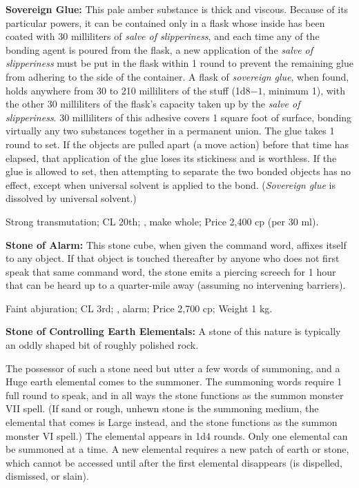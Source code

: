 \textbf{Sovereign Glue:} This pale amber substance is thick and viscous. Because of its particular powers, it can be contained only in a flask whose inside has been coated with 30 milliliters of \emph{salve of slipperiness}, and each time any of the bonding agent is poured from the flask, a new application of the \emph{salve of slipperiness} must be put in the flask within 1 round to prevent the remaining glue from adhering to the side of the container. A flask of \emph{sovereign glue}, when found, holds anywhere from 30 to 210 milliliters of the stuff (1d8$-1$, minimum 1), with the other 30 milliliters of the flask's capacity taken up by the \emph{salve of slipperiness}. 30 milliliters of this adhesive covers 1 square foot of surface, bonding virtually any two substances together in a permanent union. The glue takes 1 round to set. If the objects are pulled apart (a move action) before that time has elapsed, that application of the glue loses its stickiness and is worthless. If the glue is allowed to set, then attempting to separate the two bonded objects has no effect, except when universal solvent is applied to the bond. (\emph{Sovereign glue} is dissolved by universal solvent.)

Strong transmutation; CL 20th; , make whole; Price 2,400 cp (per 30 ml).



\textbf{Stone of Alarm:} This stone cube, when given the command word, affixes itself to any object. If that object is touched thereafter by anyone who does not first speak that same command word, the stone emits a piercing screech for 1 hour that can be heard up to a quarter-mile away (assuming no intervening barriers).

Faint abjuration; CL 3rd; , alarm; Price 2,700 cp; Weight 1 kg.



\textbf{Stone of Controlling Earth Elementals:} A stone of this nature is typically an oddly shaped bit of roughly polished rock.

The possessor of such a stone need but utter a few words of summoning, and a Huge earth elemental comes to the summoner. The summoning words require 1 full round to speak, and in all ways the stone functions as the summon monster VII spell. (If sand or rough, unhewn stone is the summoning medium, the elemental that comes is Large instead, and the stone functions as the summon monster VI spell.) The elemental appears in 1d4 rounds. Only one elemental can be summoned at a time. A new elemental requires a new patch of earth or stone, which cannot be accessed until after the first elemental disappears (is dispelled, dismissed, or slain).

